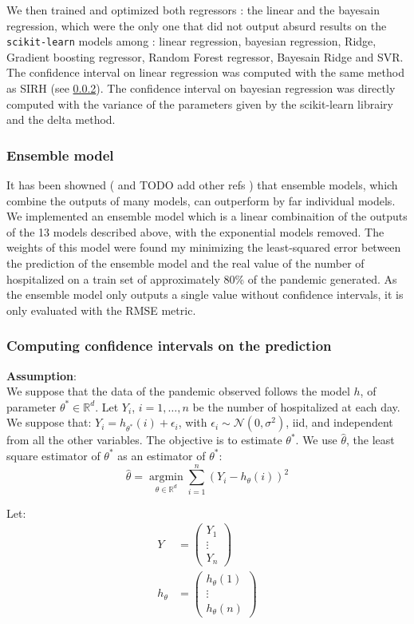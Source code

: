 We then trained and optimized both regressors : the linear and the bayesain regression, which were the only one that did not output absurd results on the \texttt{scikit-learn} models among : linear regression, bayesian regression, Ridge, Gradient boosting regressor, Random Forest regressor, Bayesain Ridge and SVR. 
The confidence interval on linear regression was computed with the same method as SIRH (see \ref*{sec:ci}).
The confidence interval on bayesian regression was directly computed with the variance of the parameters given by the scikit-learn librairy and the delta method. 

\subsubsection{Ensemble model}

It has been showned ( \cite{cramer2022evaluation} and   TODO add other refs ) that ensemble models, which combine the outputs of many models, can outperform by far individual models.
We implemented an ensemble model which is a linear combinaition of the outputs of the 13 models described above, with the exponential models removed.
The weights of this model were found my minimizing the least-squared error between the prediction of the ensemble model and the real value of the number of hospitalized on a train set of approximately 80\% of the pandemic generated. 
As the ensemble model only outputs a single value without confidence intervals, it is only evaluated with the RMSE metric. 


\subsubsection{Computing confidence intervals on the prediction}
\label{sec:ci}

\textbf{Assumption}:
\\[0.5cm]
We suppose that the data of the pandemic observed follows the model $h$, of parameter $\theta^* \in \mathbb{R}^d$. Let $Y_i$, $ i = 1, \ldots, n$ be the number of hospitalized at each day. We suppose that: $Y_i = h_{\theta ^* } (i) + \epsilon_i$, with $\epsilon_i \sim \mathcal{N}(0, \sigma^2)$, iid, and independent from all the other variables. The objective is to estimate $\theta^*$. We use $\hat{\theta}$, the least square estimator of $\theta^*$ as an estimator of $\theta^* $:
\[
\hat{\theta} =  \underset{\theta \in \mathbb{R}^d}{\operatorname{argmin}} \sum_{i=1}^{n} (Y_i - h_{\theta}(i))^2
\]

Let:
\begin{align*}
Y &= \begin{pmatrix}
Y_1 \\
\vdots \\
Y_n
\end{pmatrix} \\
h_\theta &= \begin{pmatrix}
h_\theta(1) \\
\vdots \\
h_\theta(n)
\end{pmatrix}
\end{align*}

